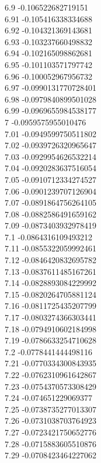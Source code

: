 {6.9	-0.106522682719151\\
6.91	-0.105416338334688\\
6.92	-0.104321369143681\\
6.93	-0.103237660498832\\
6.94	-0.102165098862681\\
6.95	-0.101103571797742\\
6.96	-0.100052967956732\\
6.97	-0.0990131770728401\\
6.98	-0.0979840899501028\\
6.99	-0.0969655984538177\\
7	-0.0959575955010476\\
7.01	-0.0949599750511802\\
7.02	-0.0939726320965647\\
7.03	-0.0929954626532214\\
7.04	-0.0920283637516054\\
7.05	-0.0910712334274527\\
7.06	-0.0901239707126904\\
7.07	-0.0891864756264105\\
7.08	-0.0882586491659162\\
7.09	-0.0873403932978419\\
7.1	-0.0864316109493212\\
7.11	-0.0855322059992461\\
7.12	-0.0846420832695782\\
7.13	-0.0837611485167261\\
7.14	-0.0828893084229992\\
7.15	-0.0820264705881124\\
7.16	-0.0811725435207799\\
7.17	-0.0803274366303441\\
7.18	-0.0794910602184998\\
7.19	-0.0786633254710628\\
7.2	-0.0778441444498116\\
7.21	-0.0770334300843935\\
7.22	-0.0762310961642867\\
7.23	-0.0754370573308429\\
7.24	-0.074651229069377\\
7.25	-0.0738735277013307\\
7.26	-0.0731038703764923\\
7.27	-0.0723421750652776\\
7.28	-0.0715883605510876\\
7.29	-0.0708423464227062\\
}
